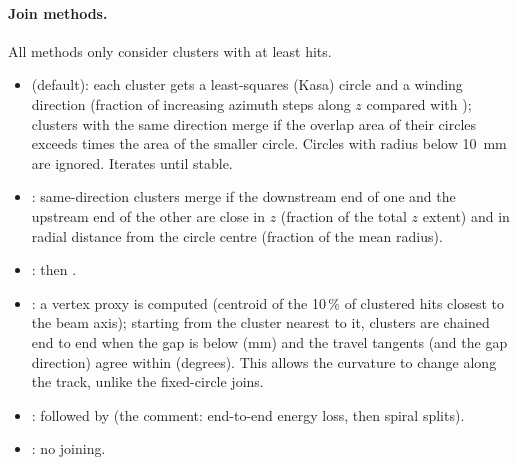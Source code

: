 \paragraph{Join methods.} All methods only consider clusters with at least 
hits.
\begin{itemize}
\item {} (default): each cluster gets a least-squares (Kasa) circle and a winding direction
  (fraction of increasing azimuth steps along $z$ compared with ); clusters with
  the same direction merge if the overlap area of their circles exceeds  times
  the area of the smaller circle. Circles with radius below 10~mm are ignored. Iterates until stable.
\item {}: same-direction clusters merge if the downstream end of one and the upstream end
  of the other are close in $z$ (fraction  of the total $z$ extent) and in radial
  distance from the circle centre (fraction  of the mean radius).
\item {}:  then .
\item {}: a vertex proxy is computed (centroid of the 10\,\% of clustered hits closest to the
  beam axis); starting from the cluster nearest to it, clusters are chained end to end when the gap is below
   (mm) and the travel tangents (and the gap direction) agree within
   (degrees). This allows the curvature to change along the track, unlike the
  fixed-circle joins.
\item {}:  followed by  (the comment: end-to-end energy loss,
  then spiral splits).
\item {}: no joining.
\end{itemize}

